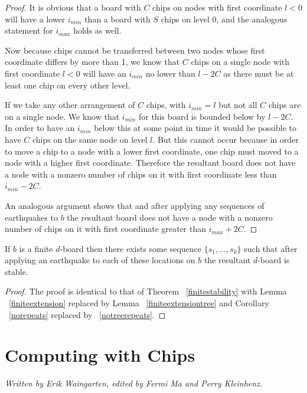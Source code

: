 \documentclass[runningheads,a4paper]{llncs}
\begin{document}
\begin{proof}
It is obvious that a board with $C$ chips on nodes with first coordinate $l<0$ will have a lower $i_{min}$ than a board with $S$ chips on level 0, and the analogous statement for $i_{max}$ holds as well. 

Now because chips cannot be transferred between two nodes whose first coordinate differs by more than 1, we know that $C$ chips on a single node with first coordinate $l<0$ will have an $i_{min}$ no lower than $l-2C$ as there must be at least one chip on every other level. 

If we take any other arrangement of $C$ chips, with $i_{min}=l$ but not all $C$ chips are on a single node. We know that $i_{min}$ for this board is bounded below by $l-2C$. In order to have an $i_{min}$ below this at some point in time it would be possible to have $C$ chips on the same node on level $l$. But this cannot occur because in order to move a chip to a node with a lower first coordinate, one chip must moved to a node with a higher first coordinate. Therefore the resultant board does not have a node with a nonzero number of chips on it with first coordinate less than $i_{min} -2C$.

An analogous argument shows that  and after applying any sequences of earthquakes to $b$ the resultant board does not have a node with a nonzero number of chips on it with first coordinate greater than $i_{max}+2C$.
\end{proof}

\begin{theorem} If $b$ is a finite $d$-board then there exists some sequence $\{s_1, \ldots, s_k\}$ such that after applying an earthquake to each of these locations on $b$ the resultant $d$-board is stable.
\end{theorem}
\begin{proof}
The proof is identical to that of Theorem ~\ref{finitestability} with Lemma ~\ref{finiteextension} replaced by Lemma ~\ref{finiteextensiontree} and Corollary ~\ref{norepeats} replaced by ~\ref{notreerepeats}.
\end{proof}


\section{Computing with Chips}
\label{Computing with Chips}

\emph{Written by Erik Waingarten, edited by Fermi Ma and Perry Kleinhenz.}
\end{document}
